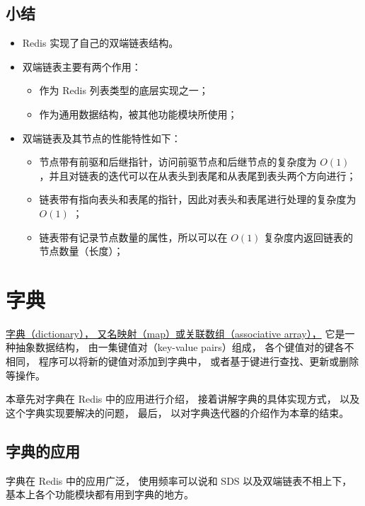 \documentclass[a4paper,11pt,english]{sphinxmanual}
\begin{document}
\subsection{小结}
\label{internal-datastruct/adlist:id9}\begin{itemize}
\item {} 
Redis 实现了自己的双端链表结构。

\item {} 
双端链表主要有两个作用：
\begin{itemize}
\item {} 
作为 Redis 列表类型的底层实现之一；

\item {} 
作为通用数据结构，被其他功能模块所使用；

\end{itemize}

\item {} 
双端链表及其节点的性能特性如下：
\begin{itemize}
\item {} 
节点带有前驱和后继指针，访问前驱节点和后继节点的复杂度为 $O(1)$ ，并且对链表的迭代可以在从表头到表尾和从表尾到表头两个方向进行；

\item {} 
链表带有指向表头和表尾的指针，因此对表头和表尾进行处理的复杂度为 $O(1)$ ；

\item {} 
链表带有记录节点数量的属性，所以可以在 $O(1)$ 复杂度内返回链表的节点数量（长度）；

\end{itemize}

\end{itemize}


\section{字典}
\label{internal-datastruct/dict:dict-chapter}\label{internal-datastruct/dict::doc}\label{internal-datastruct/dict:id1}
\href{http://en.wikipedia.org/wiki/Associative\_array}{字典（dictionary），
又名映射（map）或关联数组（associative array），}
它是一种抽象数据结构，
由一集键值对（key-value pairs）组成，
各个键值对的键各不相同，
程序可以将新的键值对添加到字典中，
或者基于键进行查找、更新或删除等操作。

本章先对字典在 Redis 中的应用进行介绍，
接着讲解字典的具体实现方式，
以及这个字典实现要解决的问题，
最后，
以对字典迭代器的介绍作为本章的结束。


\subsection{字典的应用}
\label{internal-datastruct/dict:id2}
字典在 Redis 中的应用广泛，
使用频率可以说和 SDS 以及双端链表不相上下，
基本上各个功能模块都有用到字典的地方。
\end{document}
